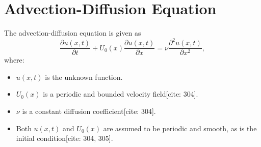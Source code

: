 \section{Advection-Diffusion Equation}\label{sec:advection_diffusion_equation}
The advection-diffusion equation is given as
\begin{equation}
    \frac{\partial u(x,t)}{\partial t} + U_0(x) \frac{\partial u(x,t)}{\partial x} = \nu \frac{\partial^2 u(x,t)}{\partial x^2},
    \label{eq:adv_diff_eq}
\end{equation}
where:
\begin{itemize}
    \item $u(x,t)$ is the unknown function.
    \item $U_0(x)$ is a periodic and bounded velocity field[cite: 304].
    \item $\nu$ is a constant diffusion coefficient[cite: 304].
    \item Both $u(x,t)$ and $U_0(x)$ are assumed to be periodic and smooth, as is the initial condition[cite: 304, 305].
\end{itemize}

